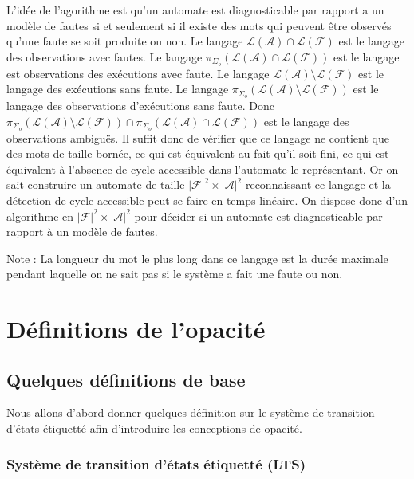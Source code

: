 \documentclass[10pt,a4paper]{article}
\begin{document}
L'id\'ee de l'agorithme est qu'un automate est diagnosticable par rapport a un mod\`ele de fautes si et seulement si il existe des mots qui peuvent être observés qu'une faute se soit produite ou non. Le langage $\mathcal L (\mathcal A) \cap \mathcal L(\mathcal F)$ est le langage des observations avec fautes. Le langage $\pi_{\Sigma_o}(\mathcal L (\mathcal A) \cap \mathcal L(\mathcal F))$ est le langage est observations des ex\'ecutions avec faute. Le langage $\mathcal L(\mathcal A) \setminus \mathcal L(\mathcal F)$ est le langage des ex\'ecutions sans faute. Le langage $\pi_{\Sigma_o}(\mathcal L(\mathcal A) \setminus \mathcal L(\mathcal F))$ est le langage des observations d'ex\'ecutions sans faute. Donc $\pi_{\Sigma_o}(\mathcal L(\mathcal A) \setminus \mathcal L(\mathcal F)) \cap \pi_{\Sigma_o}(\mathcal L (\mathcal A) \cap \mathcal L(\mathcal F))$ est le langage des observations ambiguës. Il suffit donc de v\'erifier que ce langage ne contient que des mots de taille born\'ee, ce qui est équivalent au fait qu'il soit fini, ce qui est \'equivalent \`a l'absence de cycle accessible dans l'automate le repr\'esentant. Or on sait construire un automate de taille $|\mathcal F|^2 \times |\mathcal A|^2$ reconnaissant ce langage et la d\'etection de cycle accessible peut se faire en temps lin\'eaire. On dispose donc d'un algorithme en $|\mathcal F|^2 \times |\mathcal A|^2$ pour d\'ecider si un automate est diagnosticable par rapport \`a un mod\`ele de fautes.

Note : La longueur du mot le plus long dans ce langage est la dur\'ee maximale pendant laquelle on ne sait pas si le syst\`eme a fait une faute ou non.


\section{D\'efinitions de l'opacit\'e}

\subsection{Quelques d\'efinitions de base}

Nous allons d'abord donner quelques d\'efinition sur le syst\`eme de transition d'\'etats \'etiquett\'e afin d'introduire les conceptions de opacit\'e.

\subsubsection{Syst\`eme de transition d'\'etats \'etiquett\'e (LTS)}
\end{document}
